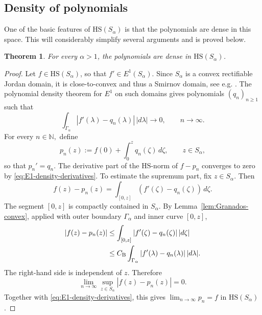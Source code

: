 \documentclass[11pt]{amsart}
\numberwithin{equation}{section}
\newtheorem{theorem}{Theorem}[section]
\newtheorem{remark}[theorem]{Remark}
\theoremstyle{definition}
\theoremstyle{plain}
\newcommand{\HS}{\mathrm{HS}}
\begin{document}
\subsection{Density of polynomials}

One of the basic features of \(\HS(S_\alpha)\) is that
the polynomials are dense in this space. 
This will considerably simplify several arguments
and is proved below.

\begin{theorem}\label{thm:density}
For every \(\alpha>1\), the polynomials are dense in \(\HS(S_\alpha)\). 
\end{theorem}

\begin{proof}
Let \(f\in\HS(S_\alpha)\), so that  \(f'\in E^1(S_\alpha)\).  Since
\(S_\alpha\) is a convex rectifiable Jordan domain, it is close-to-convex and thus a Smirnov domain,
see e.g.  \cite[p. 175]{Duren}.
The polynomial density theorem for \(E^1\) on such domains gives polynomials
\((q_n)_{n \ge 1}\) such that
\begin{equation}\label{eq:E1-density-derivatives}
        \int_{\Gamma_\alpha}|f'(\lambda)-q_n(\lambda)|\,|d\lambda|
        \longrightarrow0, \qquad n \to \infty.
\end{equation}
For every $n \in \mathbb N,$ define
\[
        p_n(z):=f(0)+\int_0^z q_n(\zeta)\,d\zeta,
        \qquad z\in S_\alpha,
\]
so that  \(p_n'=q_n\).  The
derivative part of the \(\HS\)-norm of $f-p_n$ converges to zero by
\eqref{eq:E1-density-derivatives}.  To estimate the supremum part, fix
\(z\in S_\alpha\).  Then
\[
        f(z)-p_n(z)=\int_{[0,z]}(f'(\zeta)-q_n(\zeta))\,d\zeta.
\]
The segment \([0,z]\) is compactly contained in \(S_\alpha\).  By
Lemma~\ref{lem:Granados-convex}, applied with outer boundary \(\Gamma_\alpha\)
and inner curve \([0,z]\),
\[
\begin{aligned}
        |f(z)-p_n(z)|
        &\le
        \int_{[0,z]}|f'(\zeta)-q_n(\zeta)|\,|d\zeta|       \\
        &\le
        C_{\rm B}
        \int_{\Gamma_\alpha}|f'(\lambda)-q_n(\lambda)|\,|d\lambda| .
\end{aligned}
\]
The right-hand side is independent of \(z\).  
Therefore
\[
      \lim_{n \to \infty}\sup_{z\in S_\alpha}|f(z)-p_n(z)|=0.
\]
Together with \eqref{eq:E1-density-derivatives}, this gives
\(\lim_{n \to \infty}p_n=f\) in \(\HS(S_\alpha)\).
\end{proof}
\end{document}
